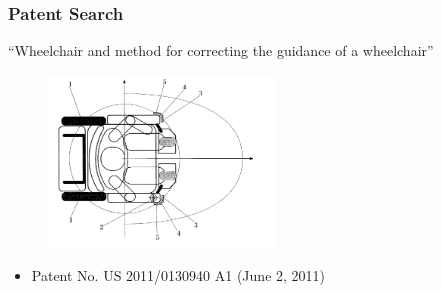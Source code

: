 \documentclass{beamer}
\begin{document}
\begin{frame}
  \frametitle{Patent Search}
  ``Wheelchair and method for correcting the guidance of a wheelchair''
	\begin{figure}
		\centering
   		\includegraphics[width=6cm]{patents3.png}
	\end{figure}
  \begin{itemize}
    \item Patent No. US 2011/0130940 A1 (June 2, 2011) \\
  \end{itemize}
\end{frame}
\end{document}
